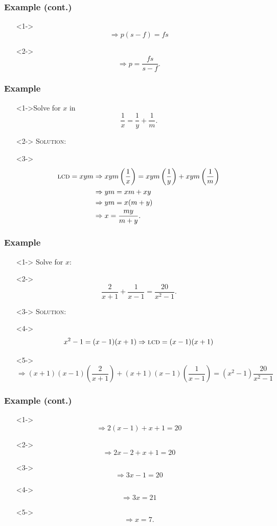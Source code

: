 \documentclass[handout]{beamer}
\begin{document}
\begin{frame}
	\frametitle{Example (cont.)}
	\begin{enumerate}
		\item[]<1-> \[ \Rightarrow p(s-f)=fs \]  
		\item[]<2-> \[ \Rightarrow p=\frac{fs}{s-f}. \] 
	\end{enumerate}
\end{frame}

\begin{frame}
	\frametitle{Example} 
	\begin{enumerate}
		\item[]<1->Solve for $x$ in 
		\[
			\frac{1}{x}=\frac{1}{y}+\frac{1}{m}. 
		\]
		\item[]<2-> \textsc{Solution:} 
		\item[]<3-> 
		\begin{align*}
			\text{\textsc{lcd}}=xym & \Rightarrow xym \left( \frac{1}{x}\right)=xym \left( \frac{1}{y}\right)+xym \left( \frac{1}{m} \right)  \\
			& \Rightarrow ym=xm+xy \\
			& \Rightarrow ym=x(m+y) \\
			& \Rightarrow x=\frac{my}{m+y}.  
		\end{align*}
	\end{enumerate}
\end{frame}

\begin{frame}
	\frametitle{Example} 
	\begin{enumerate}
		\item[]<1-> Solve for $x$: 
		\item[]<2-> \[ \frac{2}{x+1}+\frac{1}{x-1}=\frac{20}{x^{2}-1}. \] 
		\item[]<3-> \textsc{Solution:} 
		\item[]<4-> \[ x^{2}-1=(x-1)(x+1) \Rightarrow \text{\textsc{lcd}}=(x-1)(x+1) \] 
		\item[]<5-> \[ \Rightarrow (x+1)(x-1) \left( \frac{2}{x+1} \right) +(x+1)(x-1) \left( \frac{1}{x-1} \right)=(x^{2}-1) \frac{20}{x^{2}-1} \] 
	\end{enumerate}
\end{frame}

\begin{frame}
	\frametitle{Example (cont.)} 
	\begin{enumerate}
		\item[]<1-> \[ \Rightarrow 2(x-1)+x+1=20 \] 
		\item[]<2-> \[ \Rightarrow 2x-2+x+1=20 \] 
		\item[]<3-> \[ \Rightarrow 3x-1=20 \] 
		\item[]<4-> \[ \Rightarrow 3x=21 \] 
		\item[]<5-> \[ \Rightarrow x=7. \] 
	\end{enumerate}
\end{frame}
\end{document}
